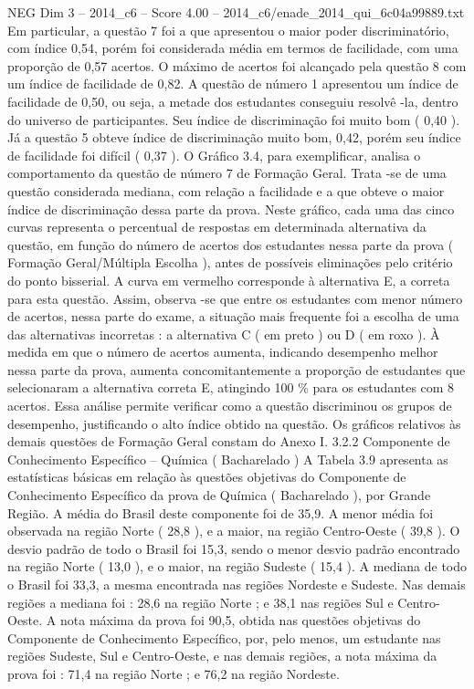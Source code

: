 \begin{textsample}{NEG Dim 3 – 2014\_c6 – Score 4.00 – 2014\_c6/enade\_2014\_qui\_6c04a99889.txt}
Em particular, a questão 7 foi a que apresentou o maior poder discriminatório, com índice 0,54, porém foi considerada média em termos de facilidade, com uma proporção de 0,57 acertos.
O máximo de acertos foi alcançado pela questão 8 com um índice de facilidade de 0,82.
A questão de número 1 apresentou um índice de facilidade de 0,50, ou seja, a metade dos estudantes conseguiu resolvê -la, dentro do universo de participantes.
Seu índice de discriminação foi muito bom ( 0,40 ).
Já a questão 5 obteve índice de discriminação muito bom, 0,42, porém seu índice de facilidade foi difícil ( 0,37 ).
O Gráfico 3.4, para exemplificar, analisa o comportamento da questão de número 7 de Formação Geral.
Trata -se de uma questão considerada mediana, com relação a facilidade e a que obteve o maior índice de discriminação dessa parte da prova.
Neste gráfico, cada uma das cinco curvas representa o percentual de respostas em determinada alternativa da questão, em função do número de acertos dos estudantes nessa parte da prova ( Formação Geral/Múltipla Escolha ), antes de possíveis eliminações pelo critério do ponto bisserial.
A curva em vermelho corresponde à alternativa E, a correta para esta questão.
Assim, observa -se que entre os estudantes com menor número de acertos, nessa parte do exame, a situação mais frequente foi a escolha de uma das alternativas incorretas : a alternativa C ( em preto ) ou D ( em roxo ).
À medida em que o número de acertos aumenta, indicando desempenho melhor nessa parte da prova, aumenta concomitantemente a proporção de estudantes que selecionaram a alternativa correta E, atingindo 100 \% para os estudantes com 8 acertos.
Essa análise permite verificar como a questão discriminou os grupos de desempenho, justificando o alto índice obtido na questão.
Os gráficos relativos às demais questões de Formação Geral constam do Anexo I. 3.2.2 Componente de Conhecimento Específico – Química ( Bacharelado ) A Tabela 3.9 apresenta as estatísticas básicas em relação às questões objetivas do Componente de Conhecimento Específico da prova de Química ( Bacharelado ), por Grande Região.
A média do Brasil deste componente foi de 35,9.
A menor média foi observada na região Norte ( 28,8 ), e a maior, na região Centro-Oeste ( 39,8 ).
O desvio padrão de todo o Brasil foi 15,3, sendo o menor desvio padrão encontrado na região Norte ( 13,0 ), e o maior, na região Sudeste ( 15,4 ).
A mediana de todo o Brasil foi 33,3, a mesma encontrada nas regiões Nordeste e Sudeste.
Nas demais regiões a mediana foi : 28,6 na região Norte ; e 38,1 nas regiões Sul e Centro-Oeste.
A nota máxima da prova foi 90,5, obtida nas questões objetivas do Componente de Conhecimento Específico, por, pelo menos, um estudante nas regiões Sudeste, Sul e Centro-Oeste, e nas demais regiões, a nota máxima da prova foi : 71,4 na região Norte ; e 76,2 na região Nordeste.

\end{textsample}
